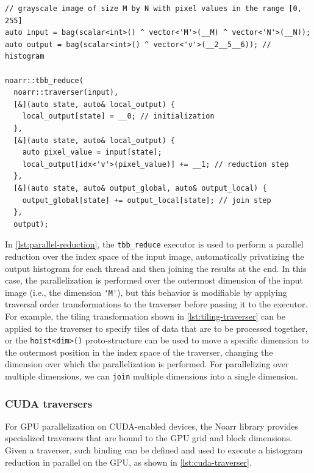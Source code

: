\begin{lstlisting}[style=C++, caption={Performing a parallel histogram reduction using a Noarr traverser and TBB backend}, label=lst:parallel-reduction,basicstyle=\ttfamily\scriptsize]
// grayscale image of size M by N with pixel values in the range [0, 255]
auto input = bag(scalar<int>() ^ vector<'M'>(__M) ^ vector<'N'>(__N));
auto output = bag(scalar<int>() ^ vector<'v'>(__2__5__6)); // histogram

noarr::tbb_reduce(
  noarr::traverser(input),
  [&](auto state, auto& local_output) {
    local_output[state] = __0; // initialization
  },
  [&](auto state, auto& local_output) {
    auto pixel_value = input[state];
    local_output[idx<'v'>(pixel_value)] += __1; // reduction step
  },
  [&](auto state, auto& output_global, auto& output_local) {
    output_global[state] += output_local[state]; // join step
  },
  output);
\end{lstlisting}

In \cref{lst:parallel-reduction}, the \lstinline{tbb_reduce} executor is used to perform a parallel reduction over the index space of the input image, automatically privatizing the output histogram for each thread and then joining the results at the end. In this case, the parallelization is performed over the outermost dimension of the input image (i.e., the dimension \lstinline{'M'}), but this behavior is modifiable by applying traversal order transformations to the traverser before passing it to the executor. For example, the tiling transformation shown in \cref{lst:tiling-traverser} can be applied to the traverser to specify tiles of data that are to be processed together, or the \lstinline{hoist<dim>()} proto-structure can be used to move a specific dimension to the outermost position in the index space of the traverser, changing the dimension over which the parallelization is performed. For parallelizing over multiple dimensions, we can \lstinline{join} multiple dimensions into a single dimension.


\subsubsection{CUDA traversers}\label{sec:cuda-traversers}

For GPU parallelization on CUDA-enabled devices, the Noarr library provides specialized traversers that are bound to the GPU grid and block dimensions. Given a traverser, such binding can be defined and used to execute a histogram reduction in parallel on the GPU, as shown in \cref{lst:cuda-traverser}.

